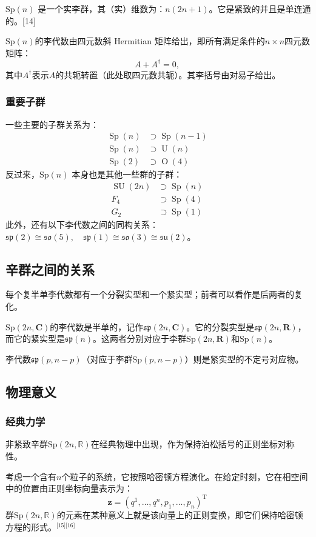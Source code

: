 $\mathrm{Sp}(n)$ 是一个实李群，其（实）维数为：$n(2n+1)$。它是紧致的并且是单连通的。[14]

$\mathrm{Sp}(n)$的李代数由四元数斜 Hermitian 矩阵给出，即所有满足条件的$n \times n$四元数矩阵：
$$
A + A^{\dagger} = 0,~
$$
其中$A^{\dagger}$表示$A$的共轭转置（此处取四元数共轭）。其李括号由对易子给出。
\subsubsection{重要子群}
一些主要的子群关系为：
$$
\begin{aligned}
\operatorname{Sp}(n) &\supset \operatorname{Sp}(n-1)\\
\operatorname{Sp}(n) &\supset \operatorname{U}(n)\\
\operatorname{Sp}(2) &\supset \operatorname{O}(4)
\end{aligned}~
$$
反过来，$\mathrm{Sp}(n)$ 本身也是其他一些群的子群：
$$
\begin{aligned}
\operatorname{SU}(2n) &\supset \operatorname{Sp}(n)\\
F_{4} &\supset \operatorname{Sp}(4)\\
G_{2} &\supset \operatorname{Sp}(1)
\end{aligned}~
$$
此外，还有以下李代数之间的同构关系：$\mathfrak{sp}(2) \cong \mathfrak{so}(5), \quad\mathfrak{sp}(1) \cong \mathfrak{so}(3) \cong \mathfrak{su}(2)$。
\subsection{辛群之间的关系}
每个复半单李代数都有一个分裂实型和一个紧实型；前者可以看作是后两者的复化。

$\mathrm{Sp}(2n, \mathbf{C})$的李代数是半单的，记作$\mathfrak{sp}(2n, \mathbf{C})$。它的分裂实型是$\mathfrak{sp}(2n, \mathbf{R})$，而它的紧实型是$\mathfrak{sp}(n)$。这两者分别对应于李群$\mathrm{Sp}(2n, \mathbf{R})$和$\mathrm{Sp}(n)$。

李代数$\mathfrak{sp}(p, n-p)$（对应于李群$\mathrm{Sp}(p, n-p)$）则是紧实型的不定号对应物。
\subsection{物理意义}
\subsubsection{经典力学}
非紧致辛群$\mathrm{Sp}(2n, \mathbb{R})$在经典物理中出现，作为保持泊松括号的正则坐标对称性。

考虑一个含有$n$个粒子的系统，它按照哈密顿方程演化。在给定时刻，它在相空间中的位置由正则坐标向量表示为：
$$
\mathbf{z} = (q^{1}, \ldots, q^{n}, p_{1}, \ldots, p_{n})^{\mathrm{T}}~
$$
群$\mathrm{Sp}(2n, \mathbb{R})$的元素在某种意义上就是该向量上的正则变换，即它们保持哈密顿方程的形式。\(^\text{[15][16]}\)

